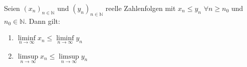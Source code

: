 Seien $(x_n)_{n \in \mathbb{N}}$ und $(y_n)_{n \in \mathbb{N}}$ reelle Zahlenfolgen mit $x_n \leq y_n$ $\forall n \geq n_0$ und $n_0 \in \mathbb{N}$. Dann gilt:
\begin{enumerate}[label=\alph*)]
    \item $\liminf\limits_{n \to \infty} x_n \leq \liminf\limits_{n \to \infty} y_n$
    \item $\limsup\limits_{n \to \infty} x_n \leq \limsup\limits_{n \to \infty} y_n$
\end{enumerate}
